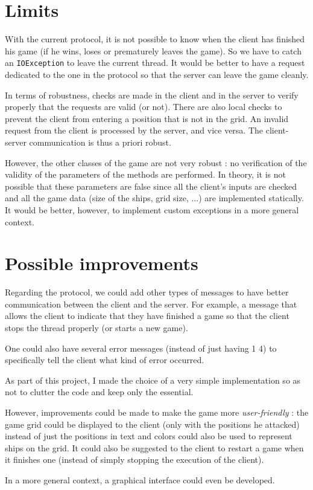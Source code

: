 \documentclass[a4paper, 12pt]{article}
\begin{document}
	\section{Limits}
	With the current protocol, it is not possible to know when the client has finished his game (if he wins, loses or prematurely leaves the game). So we have to catch an \texttt{IOException} to leave the current thread. It would be better to have a request dedicated to the one in the protocol so that the server can leave the game cleanly.\par
	In terms of robustness, checks are made in the client and in the server to verify properly that the requests are valid (or not). There are also local checks to prevent the client from entering a position that is not in the grid. An invalid request from the client is processed by the server, and vice versa. The client-server communication is thus a priori robust.\par
	However, the other classes of the game are not very robust : no verification of the validity of the parameters of the methods are performed. In theory, it is not possible that these parameters are false since all the client's inputs are checked and all the game data (size of the ships, grid size, ...) are implemented statically. It would be better, however, to implement custom exceptions in a more general context.
	\section{Possible improvements}
	Regarding the protocol, we could add other types of messages to have better communication between the client and the server. For example, a message that allows the client to indicate that they have finished a game so that the client stops the thread properly (or starts a new game).\par
	One could also have several error messages (instead of just having 1 4) to specifically tell the client what kind of error occurred.\par
	As part of this project, I made the choice of a very simple implementation so as not to clutter the code and keep only the essential.\par
	However, improvements could be made to make the game more {\it user-friendly} : the game grid could be displayed to the client (only with the positions he attacked) instead of just the positions in text and colors could also be used to represent ships on the grid. It could also be suggested to the client to restart a game when it finishes one (instead of simply stopping the execution of the client).\par
	In a more general context, a graphical interface could even be developed.
\end{document}

